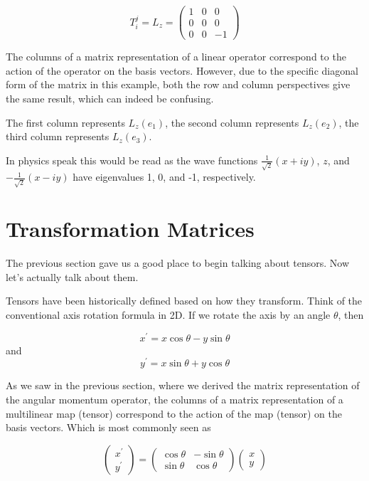 $$
T_{i}^{j}
=
L_z
=
\begin{pmatrix}
1 & 0 & 0 \\
0 & 0 & 0 \\
0 & 0 & -1
\end{pmatrix}
$$

The columns of a matrix representation of a linear operator correspond to the action of the operator on the basis vectors.
However, due to the specific diagonal form of the matrix in this example, both the row and column perspectives
give the same result, which can indeed be confusing.

The first column represents $L_z(e_1)$,
the second column represents $L_z(e_2)$,
the third column represents $L_z(e_3)$.

In physics speak this would be read as the wave functions
$\frac{1}{\sqrt{2}} (x +iy)$, $z$, and $- \frac{1}{\sqrt{2}} (x -iy)$
have eigenvalues 1, 0, and -1, respectively.



\section{Transformation Matrices}

The previous section gave us a good place to begin talking about tensors.
Now let's actually talk about them.

Tensors have been historically defined based on how they transform.
Think of the conventional axis rotation formula in 2D.
If we rotate the axis by an angle $\theta$, then

$$
x^\prime = x \cos\theta - y \sin\theta
$$
and
$$
y^\prime = x \sin\theta + y \cos\theta
$$

As we saw in the previous section,
where we derived the matrix representation of the angular momentum operator,
the columns of a matrix representation of a multilinear map (tensor) correspond to the action of
the map (tensor) on the basis vectors.
Which is most commonly seen as

$$
\begin{pmatrix}
x^\prime \\
y^\prime
\end{pmatrix}
=
\begin{pmatrix}
\cos\theta & - \sin\theta \\
\sin\theta & \cos\theta
\end{pmatrix}
\begin{pmatrix}
x \\
y
\end{pmatrix}
$$

